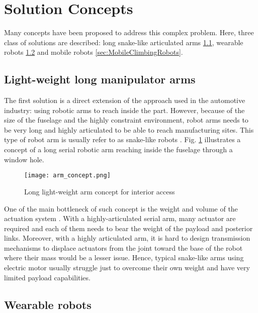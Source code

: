 \section{Solution Concepts}

Many concepts have been proposed to address this complex problem. Here, three class of solutions are described: long snake-like articulated arms \ref{sec:LightWeightLongManipulatorArm}, wearable robots \ref{sec:WearableRobots} and mobile robots \ref{sec:MobileClimbingRobots}.

\subsection{Light-weight long manipulator arms}
\label{sec:LightWeightLongManipulatorArm}

The first solution is a direct extension of the approach used in the automotive industry: using robotic arms to reach inside the part. However, because of the size of the fuselage and the highly constraint environment, robot arms needs to be very long and highly articulated to be able to reach manufacturing sites. This type of robot arm is usually refer to as snake-like robots \cite{buckingham_snake-arm_2007}. Fig. \ref{fig:arm_concept} illustrates a concept of a long serial robotic arm reaching inside the fuselage through a window hole.

\begin{figure}[H]
	\centering
		\texttt{[image: arm\_concept.png]}
		\caption{Long light-weight arm concept for interior access}
	\label{fig:arm_concept}
\end{figure}

One of the main bottleneck of such concept is the weight and volume of the actuation system \cite{roy_nonlinear_2009}. With a highly-articulated serial arm, many actuator are required and each of them needs to bear the weight of the payload and posterior links. Moreover, with a highly articulated arm, it is hard to design transmission mechanisms to displace actuators from the joint toward the base of the robot where their mass would be a lesser issue. Hence, typical snake-like arms using electric motor usually struggle just to overcome their own weight and have very limited payload capabilities.


\subsection{Wearable robots}
\label{sec:WearableRobots}

